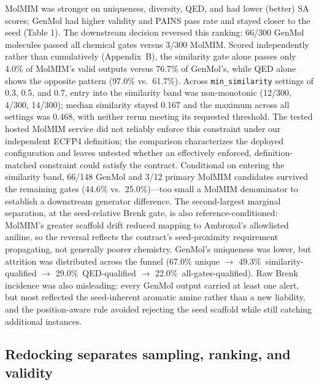 \documentclass{article}
\begin{document}
MolMIM was stronger on uniqueness, diversity, QED, and had lower (better) SA scores; GenMol had higher validity and PAINS pass rate and stayed closer to the seed (Table 1). The downstream decision reversed this ranking: 66/300 GenMol molecules passed all chemical gates versus 3/300 MolMIM. Scored independently rather than cumulatively (Appendix~B), the similarity gate alone passes only 4.0\% of MolMIM's valid outputs versus 76.7\% of GenMol's, while QED alone shows the opposite pattern (97.0\% vs.\ 61.7\%). Across \texttt{min\_similarity} settings of 0.3, 0.5, and 0.7, entry into the similarity band was non-monotonic (12/300, 4/300, 14/300); median similarity stayed 0.167 and the maximum across all settings was 0.468, with neither rerun meeting its requested threshold. The tested hosted MolMIM service did not reliably enforce this constraint under our independent ECFP4 definition; the comparison characterizes the deployed configuration and leaves untested whether an effectively enforced, definition-matched constraint could satisfy the contract. Conditional on entering the similarity band, 66/148 GenMol and 3/12 primary MolMIM candidates survived the remaining gates (44.6\% vs.\ 25.0\%)---too small a MolMIM denominator to establish a downstream generator difference. The second-largest marginal separation, at the seed-relative Brenk gate, is also reference-conditioned: MolMIM's greater scaffold drift reduced mapping to Ambroxol's allowlisted aniline, so the reversal reflects the contract's seed-proximity requirement propagating, not generally poorer chemistry. GenMol's uniqueness was lower, but attrition was distributed across the funnel (67.0\% unique $\to$ 49.3\%~similarity-qualified $\to$ 29.0\%~QED-qualified $\to$ 22.0\%~all-gates-qualified). Raw Brenk incidence was also misleading: every GenMol output carried at least one alert, but most reflected the seed-inherent aromatic amine rather than a new liability, and the position-aware rule avoided rejecting the seed scaffold while still catching additional instances.

\subsection{Redocking separates sampling, ranking, and validity}
\end{document}
